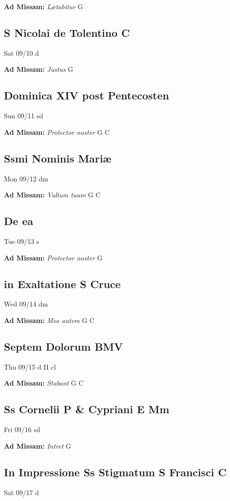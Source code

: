 \documentclass[letterpaper, 10pt, twocolumn]{article}
\begin{document}
\textbf{Ad Missam:} \textit{Lætabitur} G 

\subsection*{S Nicolai de Tolentino C}Sat 09/10 d

\textbf{Ad Missam:} \textit{Justus} G 

\subsection*{Dominica XIV post Pentecosten}Sun 09/11 sd

\textbf{Ad Missam:} \textit{Protector noster} G C 

\subsection*{Ssmi Nominis Mariæ}Mon 09/12 dm

\textbf{Ad Missam:} \textit{Vultum tuum} G C 

\subsection*{De ea}Tue 09/13 s

\textbf{Ad Missam:} \textit{Protector noster} G 

\subsection*{in Exaltatione S Cruce}Wed 09/14 dm

\textbf{Ad Missam:} \textit{Mos autem} G C 

\subsection*{Septem Dolorum BMV}Thu 09/15 d II cl

\textbf{Ad Missam:} \textit{Stabant} G C 

\subsection*{Ss Cornelii P \& Cypriani E Mm}Fri 09/16 sd

\textbf{Ad Missam:} \textit{Intret} G 

\subsection*{In Impressione Ss Stigmatum S Francisci C}Sat 09/17 d
\end{document}

